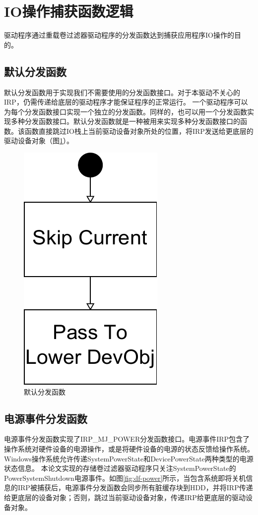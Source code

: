 
\section{IO操作捕获函数逻辑}
\label{sec:capture_io_logic}

驱动程序通过重载卷过滤器驱动程序的分发函数达到捕获应用程序IO操作的目的。

\subsection{默认分发函数}

默认分发函数用于实现我们不需要使用的分发函数接口。对于本驱动不关心的IRP，仍需传递给底层的驱动程序才能保证程序的正常运行。
一个驱动程序可以为每个分发函数接口实现一个独立的分发函数。同样的，也可以用一个分发函数实现多种分发函数接口。默认分发函数就是一种被用来实现多种分发函数接口的函数。该函数直接跳过IO栈上当前驱动设备对象所处的位置，将IRP发送给更底层的驱动设备对象（图\ref{fig:df-default}）。

\begin{figure}[H]
\centering
\includegraphics[width=0.2\linewidth]{./graph/df-default}
\caption{默认分发函数}
\label{fig:df-default}
\end{figure}

\subsection{电源事件分发函数}

电源事件分发函数实现了IRP\_MJ\_POWER分发函数接口。电源事件IRP包含了操作系统对硬件设备的电源操作，或是将硬件设备的电源的状态反馈给操作系统。
Windows操作系统允许传递SystemPowerState和DevicePowerState两种类型的电源状态信息。
本论文实现的存储卷过滤器驱动程序只关注SystemPowerState的PowerSystemShutdown电源事件。如图\ref{fig:df-power}所示，当包含系统即将关机信息的IRP被捕获后，电源事件分发函数会同步所有脏缓存块到HDD，并将IRP传递给更底层的设备对象；否则，跳过当前驱动设备对象，传递IRP给更底层的驱动设备对象。

